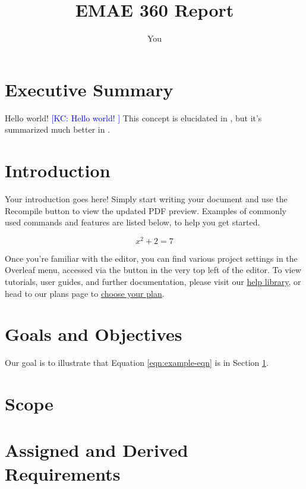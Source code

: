 \documentclass{article}
\title{EMAE 360 Report}
\author{You}
\makeatletter
\newcommand{\KCnote}[1]{{\textcolor{blue}{[KC: #1 \index{\thepage @ #1}]}}} %
\makeatother
\begin{document}
\maketitle
\newpage

\tableofcontents
\newpage

\section*{Executive Summary}
Hello world!
\KCnote{Hello world!}
This concept is elucidated in \cite{elmquist_2024}, but it's summarized much better in \cite{NIKAM20082743}.

\newpage

\section{Introduction}
\label{sec:intro}
Your introduction goes here! Simply start writing your document and use the Recompile button to view the updated PDF preview. Examples of commonly used commands and features are listed below, to help you get started. 

\begin{equation}
\label{eqn:example-eqn}
    x^2+2 = 7
\end{equation}



Once you're familiar with the editor, you can find various project settings in the Overleaf menu, accessed via the button in the very top left of the editor. To view tutorials, user guides, and further documentation, please visit our \href{https://www.overleaf.com/learn}{help library}, or head to our plans page to \href{https://www.overleaf.com/user/subscription/plans}{choose your plan}.



\section{Goals and Objectives}
Our goal is to illustrate that Equation \ref{eqn:example-eqn} is in Section \ref{sec:intro}.


\newpage
\section{Scope}

\newpage
\section{Assigned and Derived Requirements}
\end{document}
